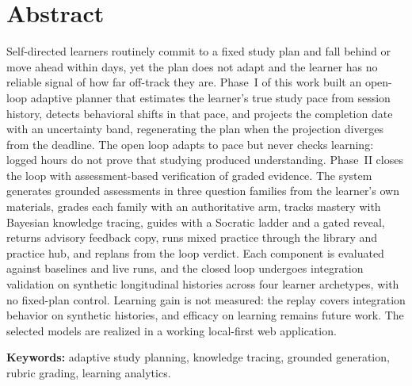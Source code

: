 \documentclass[12pt]{report}
\begin{document}
\newpage

\section*{Abstract}
Self-directed learners routinely commit to a fixed study plan and fall behind or move ahead within days, yet the plan does not adapt and the learner has no reliable signal of how far off-track they are. Phase~I of this work built an open-loop adaptive planner that estimates the learner's true study pace from session history, detects behavioral shifts in that pace, and projects the completion date with an uncertainty band, regenerating the plan when the projection diverges from the deadline. The open loop adapts to pace but never checks learning: logged hours do not prove that studying produced understanding. Phase~II closes the loop with assessment-based verification of graded evidence. The system generates grounded assessments in three question families from the learner's own materials, grades each family with an authoritative arm, tracks mastery with Bayesian knowledge tracing, guides with a Socratic ladder and a gated reveal, returns advisory feedback copy, runs mixed practice through the library and practice hub, and replans from the loop verdict. Each component is evaluated against baselines and live runs, and the closed loop undergoes integration validation on synthetic longitudinal histories across four learner archetypes, with no fixed-plan control. Learning gain is not measured: the replay covers integration behavior on synthetic histories, and efficacy on learning remains future work. The selected models are realized in a working local-first web application.

\textbf{Keywords:} adaptive study planning, knowledge tracing, grounded generation, rubric grading, learning analytics.

\newpage
\tableofcontents
\newpage
\listoffigures
\newpage
\listoftables
\newpage

\pagestyle{fancy}
\fancyhf{}
\fancyhead[LE,RO]{\small\textit{\leftmark}}
\fancyfoot[C]{\thepage}
\renewcommand{\headrulewidth}{0.4pt}

\end{document}
